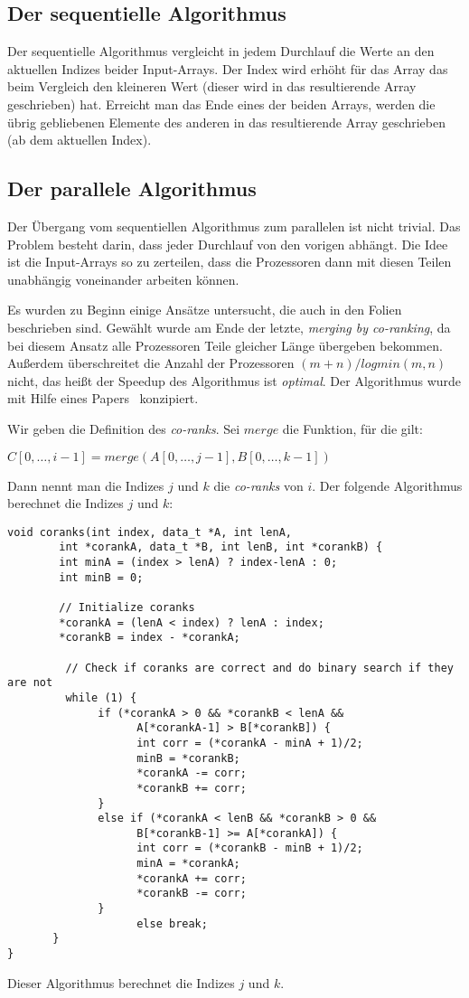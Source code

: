\subsection{Der sequentielle Algorithmus}
Der sequentielle Algorithmus vergleicht in jedem Durchlauf die Werte an den aktuellen Indizes beider Input-Arrays. Der Index wird erhöht für das Array das beim Vergleich den kleineren Wert (dieser wird in das resultierende Array geschrieben) hat. Erreicht man das Ende eines der beiden Arrays, werden die übrig gebliebenen Elemente des anderen in das resultierende Array geschrieben (ab dem aktuellen Index).

\subsection{Der parallele Algorithmus}
Der Übergang vom sequentiellen Algorithmus zum parallelen ist nicht trivial. Das Problem besteht darin, dass jeder Durchlauf von den vorigen abhängt. Die Idee ist die Input-Arrays so zu zerteilen, dass die Prozessoren dann mit diesen Teilen unabhängig voneinander arbeiten können.

Es wurden zu Beginn einige Ansätze untersucht, die auch in den Folien beschrieben sind. Gewählt wurde am Ende der letzte, \emph{merging by co-ranking}, da bei diesem Ansatz alle Prozessoren Teile gleicher Länge übergeben bekommen. Außerdem überschreitet die Anzahl der Prozessoren $(m+n) / log min(m,n)$ nicht, das heißt der Speedup des Algorithmus ist \emph{optimal}. Der Algorithmus wurde mit Hilfe eines Papers~\cite{corank} konzipiert.

Wir geben die Definition des \emph{co-ranks}. Sei $merge$ die Funktion, für die gilt:
\begin{center}
$C[0,\dots,i-1] = merge(A[0,\dots,j-1], B[0,\dots,k-1])$
\end{center}
Dann nennt man die Indizes $j$ und $k$ die \emph{co-ranks} von $i$. Der folgende Algorithmus berechnet die Indizes $j$ und $k$:
\begin{verbatim}
void coranks(int index, data_t *A, int lenA, 
        int *corankA, data_t *B, int lenB, int *corankB) {
        int minA = (index > lenA) ? index-lenA : 0;
        int minB = 0;

        // Initialize coranks
        *corankA = (lenA < index) ? lenA : index;
        *corankB = index - *corankA;

         // Check if coranks are correct and do binary search if they are not
         while (1) {
              if (*corankA > 0 && *corankB < lenA && 
                    A[*corankA-1] > B[*corankB]) {
                    int corr = (*corankA - minA + 1)/2;
                    minB = *corankB;
                    *corankA -= corr;
                    *corankB += corr;
              }
              else if (*corankA < lenB && *corankB > 0 && 
                    B[*corankB-1] >= A[*corankA]) {
                    int corr = (*corankB - minB + 1)/2;
                    minA = *corankA;
                    *corankA += corr;
                    *corankB -= corr;
              }
                    else break;
       }
}
\end{verbatim}
Dieser Algorithmus berechnet die Indizes $j$ und $k$.